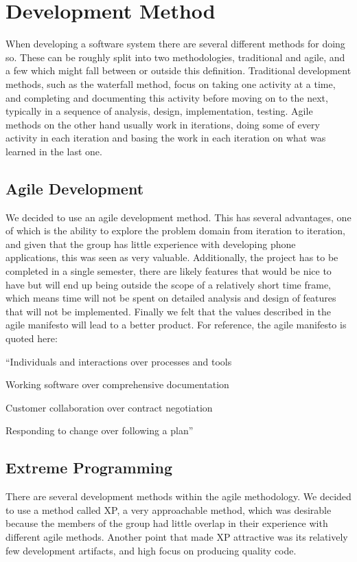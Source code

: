 \section{Development Method}

When developing a software system there are several different methods for doing so. These can be roughly split into two methodologies, traditional and agile, and a few which might fall between or outside this definition. Traditional development methods, such as the waterfall method, focus on taking one activity at a time, and completing and documenting this activity before moving on to the next, typically in a sequence of analysis, design, implementation, testing. Agile methods on the other hand usually work in iterations, doing some of every activity in each iteration and basing the work in each iteration on what was learned in the last one.

\subsection{Agile Development}

We decided to use an agile development method. This has several advantages, one of which is the ability to explore the problem domain from iteration to iteration, and given that the group has little experience with developing phone applications, this was seen as very valuable. Additionally, the project has to be completed in a single semester, there are likely features that would be nice to have but will end up being outside the scope of a relatively short time frame, which means time will not be spent on detailed analysis and design of features that will not be implemented. Finally we felt that the values described in the agile manifesto will lead to a better product. For reference, the agile manifesto is quoted here:

``Individuals and interactions over processes and tools

Working software over comprehensive documentation

Customer collaboration over contract negotiation

Responding to change over following a plan''\cite{shitmanifesto}

\subsection{Extreme Programming}

There are several development methods within the agile methodology. We decided to use a method called \ac{XP}\cite{beck04}, a very approachable method, which was desirable because the members of the group had little overlap in their experience with different agile methods. Another point that made \ac{XP} attractive was its relatively few development artifacts, and high focus on producing quality code.
